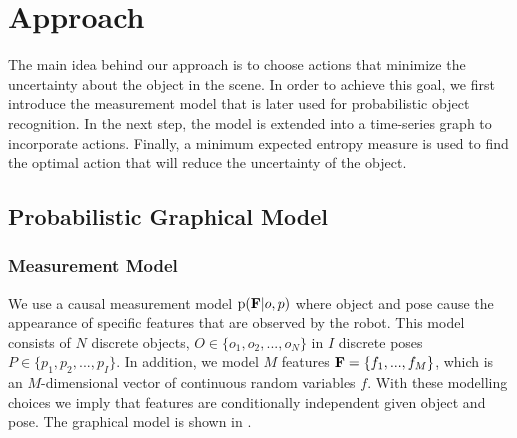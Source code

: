 \section{Approach}

The main idea behind our approach is to choose actions that minimize the uncertainty about the object in the scene. In order to achieve this goal, we first introduce the measurement model that is later used for probabilistic object recognition. In the next step, the model is extended into a time-series graph to incorporate actions. Finally, a minimum expected entropy measure is used to find the optimal action that will reduce the uncertainty of the object.

    \subsection{Probabilistic Graphical Model}
            
        \subsubsection{Measurement Model}
            We use a causal measurement model $\text{p}(\mathbf{F}|o,p)$ where object and pose cause the appearance of specific features that are observed by the robot. This model consists of $N$ discrete objects, $O \in \{o_1,o_2, ..., o_N\}$ in $I$ discrete poses $P \in \{p_1,p_2, ..., p_I\}$. In addition, we model $M$ features $\mathbf{F} = \left\{ f_1, ...,  f_M\right\}$, which is an $M$-dimensional vector of continuous random variables $f$. With these modelling choices we imply that features are conditionally independent given object and pose. The graphical model is shown in .


